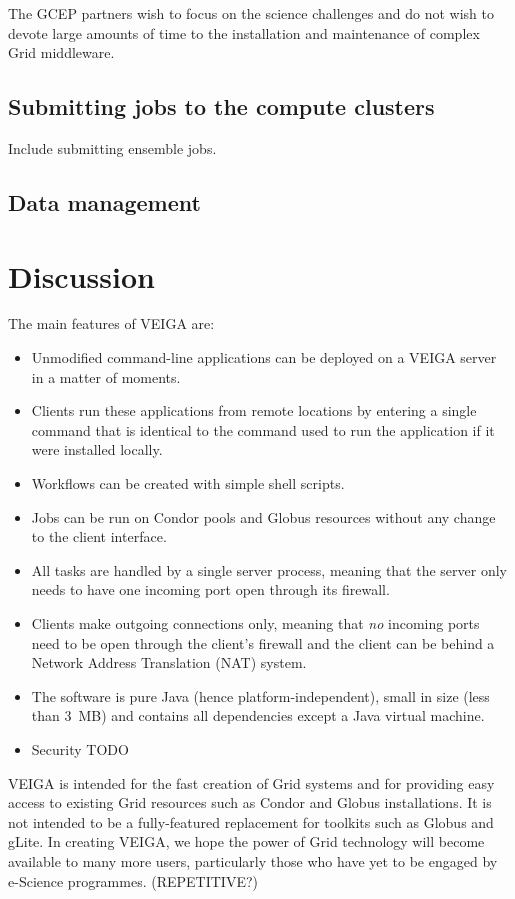 \documentclass[a4paper]{article}
\begin{document}
\begin{multicols}{2}
The GCEP partners wish to focus on the science challenges and do not wish to devote large amounts of time to the installation and maintenance of complex Grid middleware.

\subsection{Submitting jobs to the compute clusters}

Include submitting ensemble jobs.

\subsection{Data management}


\section{Discussion}



The main features of VEIGA are:
\begin{itemize}
\item Unmodified command-line applications can be deployed on a VEIGA server in a matter of moments.
\item Clients run these applications from remote locations by entering a single command that is identical to the command used to run the application if it were installed locally.
\item Workflows can be created with simple shell scripts.
\item Jobs can be run on Condor pools and Globus resources without any change to the client interface.
\item All tasks are handled by a single server process, meaning that the server only needs to have one incoming port open through its firewall.
\item Clients make outgoing connections only, meaning that {\em no\/} incoming ports need to be open through the client's firewall and the client can be behind a Network Address Translation (NAT) system.
\item The software is pure Java (hence platform-independent), small in size (less than 3~MB) and contains all dependencies except a Java virtual machine.
\item Security TODO
\end{itemize}

VEIGA is intended for the fast creation of Grid systems and for providing easy access to existing Grid resources such as Condor and Globus installations.  It is not intended to be a fully-featured replacement for toolkits such as Globus and gLite.  In creating VEIGA, we hope the power of Grid technology will become available to many more users, particularly those who have yet to be engaged by e-Science programmes.  (REPETITIVE?)


\end{multicols}
\end{document}
